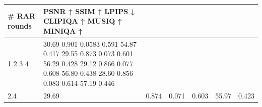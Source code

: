 \begin{tabular}{lllllll}
\toprule
\# RAR rounds & PSNR ↑ SSIM ↑ LPIPS ↓ CLIPIQA ↑ MUSIQ ↑ MINIQA ↑ &  &  &  &  &  \\
\midrule
1 2 3 4 & 30.69 0.901 0.0583 0.591 54.87 0.417 29.55 0.873 0.073 0.601 56.29 0.428 29.12 0.866 0.077 0.608 56.80 0.438 28.60 0.856 0.083 0.614 57.19 0.446 &  &  &  &  &  \\
2.4 & 29.69 & 0.874 & 0.071 & 0.603 & 55.97 & 0.423 \\
\bottomrule
\end{tabular}
